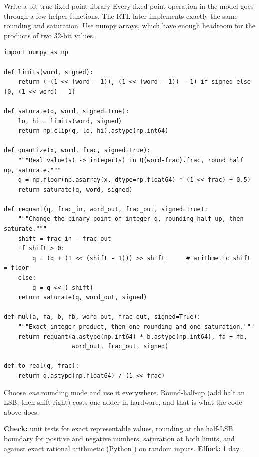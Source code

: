 \begin{stepbox}[label=st:codesign:fxlib]{Write a bit-true fixed-point library}
Every fixed-point operation in the model goes through a few helper functions.
The RTL later implements exactly the same rounding and saturation. Use numpy
 arrays, which have enough headroom for the products of two 32-bit
values.

\begin{lstlisting}[style=py,caption={The heart of \texttt{golden/fixedpoint.py}.}]
import numpy as np

def limits(word, signed):
    return (-(1 << (word - 1)), (1 << (word - 1)) - 1) if signed else (0, (1 << word) - 1)

def saturate(q, word, signed=True):
    lo, hi = limits(word, signed)
    return np.clip(q, lo, hi).astype(np.int64)

def quantize(x, word, frac, signed=True):
    """Real value(s) -> integer(s) in Q(word-frac).frac, round half up, saturate."""
    q = np.floor(np.asarray(x, dtype=np.float64) * (1 << frac) + 0.5)
    return saturate(q, word, signed)

def requant(q, frac_in, word_out, frac_out, signed=True):
    """Change the binary point of integer q, rounding half up, then saturate."""
    shift = frac_in - frac_out
    if shift > 0:
        q = (q + (1 << (shift - 1))) >> shift      # arithmetic shift = floor
    else:
        q = q << (-shift)
    return saturate(q, word_out, signed)

def mul(a, fa, b, fb, word_out, frac_out, signed=True):
    """Exact integer product, then one rounding and one saturation."""
    return requant(a.astype(np.int64) * b.astype(np.int64), fa + fb,
                   word_out, frac_out, signed)

def to_real(q, frac):
    return q.astype(np.float64) / (1 << frac)
\end{lstlisting}

Choose \emph{one} rounding mode and use it everywhere. Round-half-up (add half
an LSB, then shift right) costs one adder in hardware, and that is what the code
above does.

\textbf{Check:} unit tests for exact representable values, rounding at the
half-LSB boundary for positive and negative numbers, saturation at both limits,
and  against exact rational arithmetic (Python ) on
random inputs. \textbf{Effort:} 1 day.
\end{stepbox}

